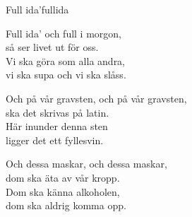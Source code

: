 \begin{song}{Full ida'}{fullida}
\begin{vers}
Full ida' och full i morgon,\\
så ser livet ut för oss.\\
Vi ska göra som alla andra,\\
vi ska supa och vi ska slåss.\\
\end{vers}
\begin{vers}
Och på vår gravsten, och på vår gravsten,\\
ska det skrivas på latin.\\
Här inunder denna sten\\
ligger det ett fyllesvin.\\
\end{vers}
\begin{vers}
Och dessa maskar, och dessa maskar,\\
dom ska äta av vår kropp.\\
Dom ska känna alkoholen,\\
dom ska aldrig komma opp.\\
\end{vers}
\end{song}

